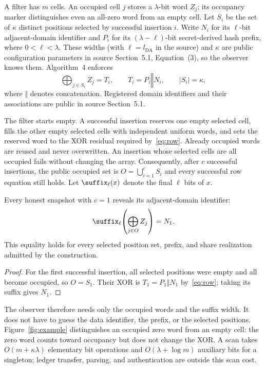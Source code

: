A filter has $m$ cells. An occupied cell $j$ stores a $\lambda$-bit word $Z_j$;
its occupancy marker distinguishes even an all-zero word from an empty cell.
Let $S_i$ be the set of $\kappa$ distinct positions selected by successful
insertion $i$. Write $N_i$ for its $\ell$-bit adjacent-domain identifier and
$P_i$ for its $(\lambda-\ell)$-bit secret-derived hash prefix, where
$0<\ell<\lambda$. These widths (with $\ell=l_{\mathrm{DA}}$ in the source)
and $\kappa$ are public configuration
parameters in source Section~5.1, Equation~(3), so the observer knows them.
Algorithm~4 enforces
\begin{equation}
  \bigoplus_{j\in S_i} Z_j = T_i,
  \qquad T_i=P_i\mathbin\Vert N_i,
  \qquad |S_i|=\kappa,
  \label{eq:row}
\end{equation}
where $\Vert$ denotes concatenation. Registered domain identifiers and their
associations are public in source Section~5.1.

The filter starts empty. A successful insertion reserves one empty selected
cell, fills the other empty selected cells with independent uniform words,
and sets the reserved word to the XOR residual required by~\eqref{eq:row}.
Already occupied words are reused and never overwritten. An insertion whose
selected cells are all occupied fails without changing the array. Consequently,
after $c$ successful insertions, the public occupied set is
$O=\bigcup_{i=1}^{c}S_i$ and every successful row equation still holds.
Let $\suffix_\ell(x)$ denote the final $\ell$ bits of $x$.

\begin{proposition}
\label{prop:singleton}
Every honest snapshot with $c=1$ reveals its adjacent-domain identifier:
\begin{equation}
  \suffix_\ell\!\left(\bigoplus_{j\in O}Z_j\right)=N_1.
  \label{eq:singleton}
\end{equation}
This equality holds for every selected position set, prefix, and share
realization admitted by the construction.
\end{proposition}

\begin{proof}
For the first successful insertion, all selected positions were empty and
all become occupied, so $O=S_1$. Their XOR is $T_1=P_1\Vert N_1$
by~\eqref{eq:row}; taking its suffix gives $N_1$.
\end{proof}

The observer therefore needs only the occupied words and the suffix width.
It does not have to guess the data identifier, the prefix, or the selected
positions. Figure~\ref{fig:example} distinguishes an occupied zero word from
an empty cell: the zero word counts toward occupancy but does not change the XOR.
A scan takes
$O(m+\kappa\lambda)$ elementary bit operations and
$O(\lambda+\log m)$ auxiliary bits for a singleton; ledger transfer,
parsing, and authentication are outside this scan cost.

